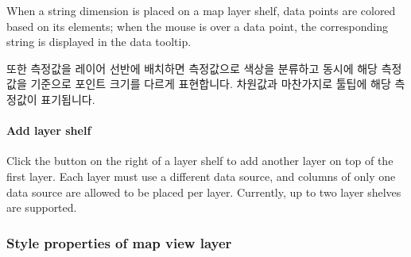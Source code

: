 \documentclass[letterpaper,10pt,english]{sphinxmanual}
\begin{document}
When a string dimension is placed on a map layer shelf, data points are colored based on its elements; when the mouse is over a data point, the corresponding string is displayed in the data tooltip.
\begin{quote}

\begin{figure}[H]
\centering

\noindent{}
\end{figure}
\end{quote}

또한 측정값을 레이어 선반에 배치하면 측정값으로 색상을 분류하고 동시에 해당 측정값을 기준으로 포인트 크기를 다르게 표현합니다. 차원값과 마찬가지로 툴팁에 해당 측정값이 표기됩니다.
\begin{quote}

\begin{figure}[H]
\centering

\noindent{}
\end{figure}
\end{quote}


\paragraph{Add layer shelf}
\label{\detokenize{discovery/part04/map_chart:id4}}
Click the \sphinxcode{\sphinxupquote{+}} button on the right of a layer shelf to add another layer on top of the first layer. Each layer must use a different data source, and columns of only one data source are allowed to be placed per layer. Currently, up to two layer shelves are supported.
\begin{quote}

\begin{figure}[H]
\centering

\noindent{}
\end{figure}
\end{quote}


\subsubsection{Style properties of map view layer}
\label{\detokenize{discovery/part04/map_chart:id5}}
\end{document}
